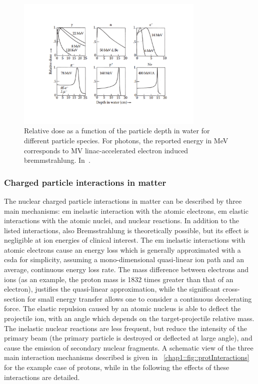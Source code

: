 \begin{figure}[!htbp]
\centering
\includegraphics[width=0.8\textwidth , trim={0.5cm 0.5cm 0.5cm 0.5cm}, clip=true]{03_GraphicFiles/chapter1_Introduction/depth_doseProf_multipleIMG.pdf}
\caption{Relative dose as a function of the particle depth in water for different particle species. For photons, the reported energy in MeV corresponds to MV linac-accelerated electron induced bremmstrahlung. In~\cite{PaganettiBook2012}.}
\label{chap1::fig::Depth-doseProf}
\end{figure} 

\subsubsection{Charged particle interactions in matter}\label{chap1::subsubsec::ionInteractions}

The nuclear charged particle interactions in matter can be described by three main mechanisms: \gls{em} inelastic interaction with the atomic electrons, \gls{em} elastic interactions with the atomic nuclei, and nuclear reactions. In addition to the listed interactions, also Bremsstrahlung is theoretically possible, but its effect is negligible at ion energies of clinical interest. 
The \gls{em} inelastic interactions with atomic electrons cause an energy loss which is generally approximated with a \gls{csda} for simplicity, assuming a mono-dimensional quasi-linear ion path and an average, continuous energy loss rate. The mass difference between electrons and ions (as an example, the proton mass is 1832 times greater than that of an electron), justifies the quasi-linear approximation, while the significant cross-section for small energy transfer allows one to consider a continuous decelerating force. The elastic repulsion caused by an atomic nucleus is able to deflect the projectile ion, with an angle which depends on the target-projectile relative mass. The inelastic nuclear reactions are less frequent, but reduce the intensity of the primary beam (the primary particle is destroyed or deflected at large angle), and cause the emission of secondary nuclear fragments. A schematic view of the three main interaction mechanisms described is given in \figurename~\ref{chap1::fig::protInteractions} for the example case of protons, while in the following the effects of these interactions are detailed.   

